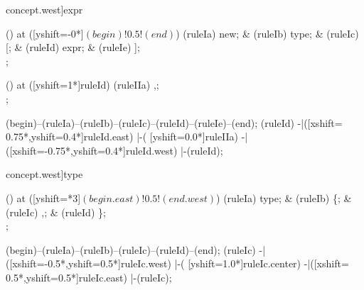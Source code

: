 \begin{syntax}[[xshift=22mm]concept.west]{expr}
  
  \node[sequence,column sep=1.5cm] () at ([yshift=-0*\syntaxruledist]$(begin)!0.5!(end)$) {
    \node[terminal]       (ruleIa) {new};
    &
    \node[nonterminal]    (ruleIb) {type};
    &
    \node[terminal]       (ruleIc) {[};
    &
    \node[nonterminal]    (ruleId) {expr};
    &
    \node[terminal]       (ruleIe) {]};
    \\
  };
  
  \node[sequence,column sep=1.0cm] () at ([yshift=1*\syntaxruledist]ruleId) {
    \node[terminal]    (ruleIIa) {,};
    \\
  };
  
  \draw[path] (begin)--(ruleIa)--(ruleIb)--(ruleIc)--(ruleId)--(ruleIe)--(end);
  \draw[path] (ruleId)
            -|([xshift= 0.75*\syntaxruledist,yshift=0.4*\syntaxruledist]ruleId.east)
            |-(                            [yshift=0.0*\syntaxruledist]ruleIIa)
            -|([xshift=-0.75*\syntaxruledist,yshift=0.4*\syntaxruledist]ruleId.west)
            |-(ruleId);
\end{syntax}

\begin{syntax}[[xshift=22mm]concept.west]{type}
  
  \node[sequence,anchor=north,column sep=1.5cm] () at ([yshift=\syntaxrulenodeheight-0.8pt*3]$(begin.east)!0.5!(end.west)$) {
    \node[nonterminal] (ruleIa) {type};
    &
    \node[terminal]    (ruleIb) {\{};
    &
    \node[terminal]    (ruleIc) {,};
    &
    \node[terminal]    (ruleId) {\}};
    \\
  };
  
  \draw[path] (begin)--(ruleIa)--(ruleIb)--(ruleIc)--(ruleId)--(end);
  \draw[path] (ruleIc)
            -|([xshift=-0.5*\syntaxruledist,yshift=0.5*\syntaxruledist]ruleIc.west)
            |-(                            [yshift=1.0*\syntaxruledist]ruleIc.center)
            -|([xshift= 0.5*\syntaxruledist,yshift=0.5*\syntaxruledist]ruleIc.east)
            |-(ruleIc);
\end{syntax}

